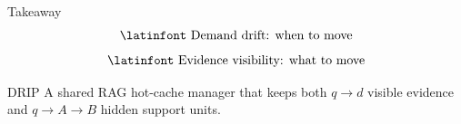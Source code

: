 \documentclass[aspectratio=169,10pt]{beamer}
\newcommand{\en}[1]{{\latinfont #1}}
\newcommand{\dive}{\en{DRIP}}
\begin{document}
\begin{frame}{Takeaway}
  \centering
  \Large
  \[
    \text{\en{Demand drift: when to move}}
  \]
  \[
    \text{\en{Evidence visibility: what to move}}
  \]

  \vspace{0.5em}
  \begin{alertblock}{\dive{}}
    A shared RAG hot-cache manager that keeps both
    $q\rightarrow d$ visible evidence and $q\rightarrow A\rightarrow B$
    hidden support units.
  \end{alertblock}
\end{frame}
\end{document}

